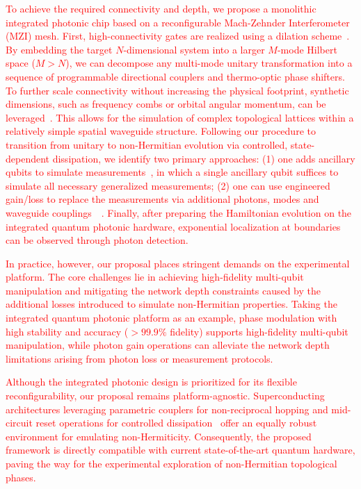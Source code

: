 \documentclass[longbibliography, aps, prx, amsmath, amssymb, amsfonts, twocolumn,superscriptaddress, footinbib]{revtex4-1}
\begin{document}
	\textcolor{red}{
	To achieve the required connectivity and depth, we propose a monolithic integrated photonic chip based on a reconfigurable Mach-Zehnder Interferometer (MZI) mesh. First, high-connectivity gates are realized using a dilation scheme~\cite{paesani2017experimental,qiang2018large,chi2022programmable}. By embedding the target $N$-dimensional system into a larger $M$-mode Hilbert space ($M > N$), we can decompose any multi-mode unitary transformation into a sequence of programmable directional couplers and thermo-optic phase shifters. To further scale connectivity without increasing the physical footprint, synthetic dimensions, such as frequency combs or orbital angular momentum, can be leveraged~\cite{wang2018multidimensional,yu2025comprehensive}. This allows for the simulation of complex topological lattices within a relatively simple spatial waveguide structure. Following our procedure to transition from unitary to non-Hermitian evolution via controlled, state-dependent dissipation, we identify two primary approaches: (1) one adds ancillary qubits to simulate measurements~\cite{hoch2025quantum}, in which a single ancillary qubit suffices to simulate all necessary generalized measurements; (2) one can use engineered gain/loss to replace the measurements via additional photons, modes and waveguide couplings~~\cite{hoch2025quantum, carolan2020variational}. Finally, after preparing the Hamiltonian evolution on the integrated quantum photonic hardware, exponential localization at boundaries can be observed through photon detection. 
	}

	\textcolor{red}{
	In practice, however, our proposal places stringent demands on the experimental platform. The core challenges lie in achieving high-fidelity multi-qubit manipulation and mitigating the network depth constraints caused by the additional losses introduced to simulate non-Hermitian properties. Taking the integrated quantum photonic platform as an example, phase modulation with high stability and accuracy ($>99.9\%$ fidelity) supports high-fidelity multi-qubit manipulation, while photon gain operations can alleviate the network depth limitations arising from photon loss or measurement protocols.
	}

	\textcolor{red}{
	Although the integrated photonic design is prioritized for its flexible reconfigurability, our proposal remains platform-agnostic. Superconducting architectures leveraging parametric couplers for non-reciprocal hopping and mid-circuit reset operations for controlled dissipation~\cite{shen2024enhanced,shen2025observation} offer an equally robust environment for emulating non-Hermiticity. Consequently, the proposed framework is directly compatible with current state-of-the-art quantum hardware, paving the way for the experimental exploration of non-Hermitian topological phases.
	}
\end{document}
